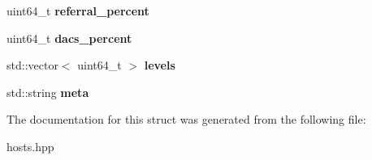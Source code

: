 \begin{DoxyCompactItemize}
uint64\+\_\+t {\bfseries referral\+\_\+percent}
\item 
\mbox{\label{structeosio_1_1upgrade_a8086d7110af3723c2ef61cef732dc0f2}} 
uint64\+\_\+t {\bfseries dacs\+\_\+percent}
\item 
\mbox{\label{structeosio_1_1upgrade_ad72c7d67ce35690581741b4ab1296155}} 
std\+::vector$<$ uint64\+\_\+t $>$ {\bfseries levels}
\item 
\mbox{\label{structeosio_1_1upgrade_af5dc369ac7f5a1025488820aa8272bc3}} 
std\+::string {\bfseries meta}
\end{DoxyCompactItemize}


The documentation for this struct was generated from the following file\+:\begin{DoxyCompactItemize}
\item 
hosts.\+hpp\end{DoxyCompactItemize}
